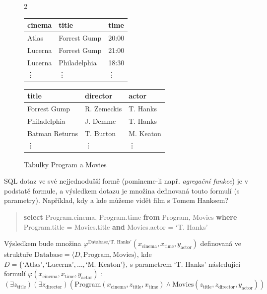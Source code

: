 \begin{figure}[htbp]
\begin{multicols}{2}
    \ttfamily\small
    \begin{tabular}{lll}
        cinema         & title          & time   \\ \hline
        Atlas          & Forrest Gump   & 20:00  \\
        Lucerna        & Forrest Gump   & 21:00  \\
        Lucerna        & Philadelphia   & 18:30  \\
        \vdots         & \vdots         & \vdots
    \end{tabular}

    \begin{tabular}{lll}
        title          & director    & actor \\ \hline
        Forrest Gump   & R. Zemeckis & T. Hanks      \\
        Philadelphia   & J. Demme    & T. Hanks      \\
        Batman Returns & T. Burton   & M. Keaton     \\
        \vdots         & \vdots      & \vdots
    \end{tabular}    
\end{multicols}
\caption{Tabulky Program a Movies}
\label{figure:datbase}
\end{figure}

SQL dotaz ve své nejjednodušší formě (pomineme-li např. \emph{agregační funkce}) je v podstatě formule, a výsledkem dotazu je množina definovaná touto formulí (s parametry). Například, kdy a kde můžeme vidět film s Tomem Hanksem?

\begin{quote}
    \textbf{select} Program.cinema, Program.time \textbf{from} Program, Movies \textbf{where}\\ Program.title = Movies.title  \textbf{and} Movies.actor = `T. Hanks'   
\end{quote}

Výsledkem bude množina $\varphi^{\text{Database},\text{`T. Hanks'}} (x_\mathrm{cinema},x_\mathrm{time},y_\mathrm{actor})$ definovaná ve struktuře $\text{Database}=\langle D, \mathrm{Program}, \mathrm{Movies}\rangle$, kde $D=\{\text{`Atlas'},\text{`Lucerna'},\dots,\text{`M. Keaton'}\}$, s parametrem `T. Hanks' následující formulí $\varphi(x_\mathrm{cinema},x_\mathrm{time},y_\mathrm{actor})$ :
$$
(\exists z_\mathrm{title})(\exists z_\mathrm{director})(\mathrm{Program}(x_\mathrm{cinema},z_\mathrm{title},x_\mathrm{time}) \land \mathrm{Movies}(z_\mathrm{title},z_\mathrm{director},y_\mathrm{actor}))
$$


